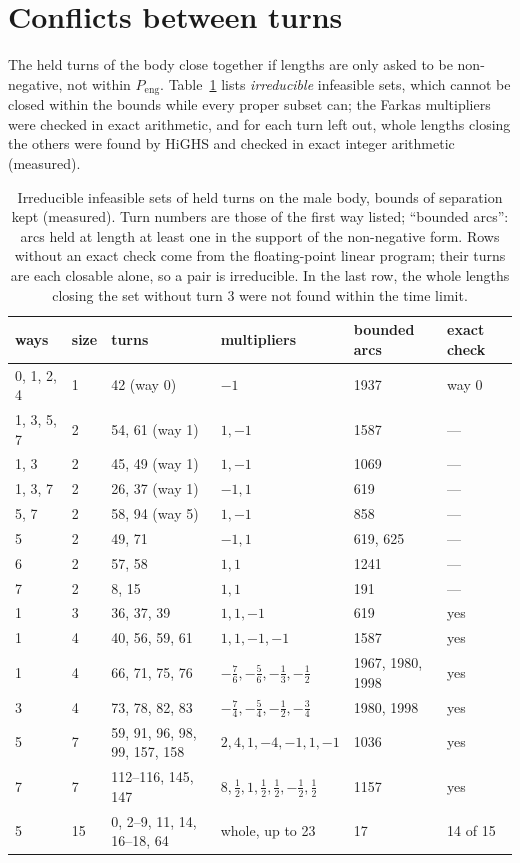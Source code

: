 \documentclass[11pt,a4paper]{article}
\begin{document}
\section{Conflicts between turns}\label{sec:conflicts}

The held turns of the body close together if lengths are only asked to be
non-negative, not within $P_{\mathrm{eng}}$. Table~\ref{tab:iis} lists
\emph{irreducible} infeasible sets, which cannot be closed within the bounds
while every proper subset can; the Farkas multipliers were checked in exact
arithmetic, and for each turn left out, whole lengths closing the others were
found by HiGHS and checked in exact integer arithmetic (measured).

\begin{table}[t]
\centering
\small
\begin{tabular}{llllll}
\toprule
ways & size & turns & multipliers & bounded arcs & exact check \\
\midrule
0, 1, 2, 4 & 1 & 42 (way 0) & $-1$ & 1937 & way 0 \\
1, 3, 5, 7 & 2 & 54, 61 (way 1) & $1, -1$ & 1587 & --- \\
1, 3 & 2 & 45, 49 (way 1) & $1, -1$ & 1069 & --- \\
1, 3, 7 & 2 & 26, 37 (way 1) & $-1, 1$ & 619 & --- \\
5, 7 & 2 & 58, 94 (way 5) & $1, -1$ & 858 & --- \\
5 & 2 & 49, 71 & $-1, 1$ & 619, 625 & --- \\
6 & 2 & 57, 58 & $1, 1$ & 1241 & --- \\
7 & 2 & 8, 15 & $1, 1$ & 191 & --- \\
1 & 3 & 36, 37, 39 & $1, 1, -1$ & 619 & yes \\
1 & 4 & 40, 56, 59, 61 & $1, 1, -1, -1$ & 1587 & yes \\
1 & 4 & 66, 71, 75, 76 & $-\tfrac76, -\tfrac56, -\tfrac13, -\tfrac12$ & 1967, 1980, 1998 & yes \\
3 & 4 & 73, 78, 82, 83 & $-\tfrac74, -\tfrac54, -\tfrac12, -\tfrac34$ & 1980, 1998 & yes \\
5 & 7 & 59, 91, 96, 98, 99, 157, 158 & $2, 4, 1, -4, -1, 1, -1$ & 1036 & yes \\
7 & 7 & 112--116, 145, 147 & $8, \tfrac12, 1, \tfrac12, \tfrac12, -\tfrac12, \tfrac12$ & 1157 & yes \\
5 & 15 & 0, 2--9, 11, 14, 16--18, 64 & whole, up to 23 & 17 & 14 of 15 \\
\bottomrule
\end{tabular}
\caption{Irreducible infeasible sets of held turns on the male body, bounds of
separation kept (measured). Turn numbers are those of the first way listed;
``bounded arcs'': arcs held at length at least one in the support of the
non-negative form. Rows without an exact check come from the floating-point
linear program; their turns are each closable alone, so a pair is
irreducible. In the last row, the whole lengths closing the set without turn 3
were not found within the time limit.}
\label{tab:iis}
\end{table}
\end{document}
